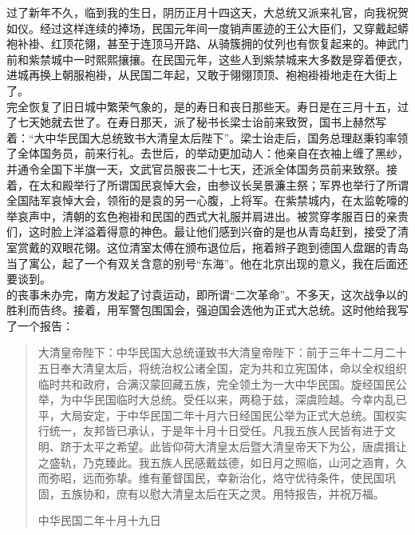 过了新年不久，临到我的生日，阴历正月十四这天，大总统又派来礼官，向我祝贺如仪。经过这样连续的捧场，民国元年间一度销声匿迹的王公大臣们，又穿戴起蟒袍补褂、红顶花翎，甚至于连顶马开路、从骑簇拥的仗列也有恢复起来的。神武门前和紫禁城中一时熙熙攘攘。在民国元年，这些人到紫禁城来大多数是穿着便衣，进城再换上朝服袍褂，从民国二年起，又敢于翎翎顶顶、袍袍褂褂地走在大街上了。\\

完全恢复了旧日城中繁荣气象的，是的寿日和丧日那些天。寿日是在三月十五，过了七天她就去世了。在寿日那天，派了秘书长梁士诒前来致贺，国书上赫然写着：“大中华民国大总统致书大清皇太后陛下”。梁士诒走后，国务总理赵秉钧率领了全体国务员，前来行礼。去世后，的举动更加动人：他亲自在衣袖上缠了黑纱，并通令全国下半旗一天，文武官员服丧二十七天，还派全体国务员前来致祭。接着，在太和殿举行了所谓国民哀悼大会，由参议长吴景濂主祭；军界也举行了所谓全国陆军哀悼大会，领衔的是袁的另一心腹，上将军。在紫禁城内，在太监乾嚎的举哀声中，清朝的玄色袍褂和民国的西式大礼服并肩进出。被赏穿孝服百日的亲贵们，这时脸上洋溢着得意的神色。最让他们感到兴奋的是也从青岛赶到，接受了清室赏戴的双眼花翎。这位清室太傅在颁布退位后，拖着辫子跑到德国人盘踞的青岛当了寓公，起了一个有双关含意的别号“东海”。他在北京出现的意义，我在后面还要谈到。\\

的丧事未办完，南方发起了讨袁运动，即所谓“二次革命”。不多天，这次战争以的胜利而告终。接着，用军警包围国会，强迫国会选他为正式大总统。这时他给我写了一个报告：\\

\begin{quote}
	大清皇帝陛下：中华民国大总统谨致书大清皇帝陛下：前于三年十二月二十五日奉大清皇太后，将统治权公诸全国，定为共和立宪国体，命以全权组织临时共和政府，合满汉蒙回藏五族，完全领土为一大中华民国。旋经国民公举，为中华民国临时大总统。受任以来，两稳于兹，深虞险越。今幸内乱已平，大局安定，于中华民国二年十月六日经国民公举为正式大总统。国权实行统一，友邦皆已承认，于是年十月十日受任。凡我五族人民皆有进于文明、跻于太平之希望。此皆仰荷大清皇太后暨大清皇帝天下为公，唐虞揖让之盛轨，乃克臻此。我五族人民感戴兹德，如日月之照临，山河之涵育，久而弥昭，远而弥挚。维有董督国民，幸新治化，烙守优待条件，使民国巩固，五族协和，庶有以慰大清皇太后在天之灵。用特报告，并祝万福。\\

\begin{flushright}
	中华民国二年十月十九日\\
	
\end{flushright}


\end{quote}

